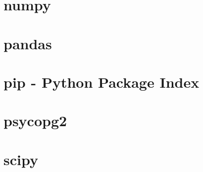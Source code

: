 \documentclass{article}
\begin{document}
%

\section{numpy}


\section{pandas}


\section{pip - Python Package Index}


\section{psycopg2}

\section{scipy}

\newpage

%

\end{document}
